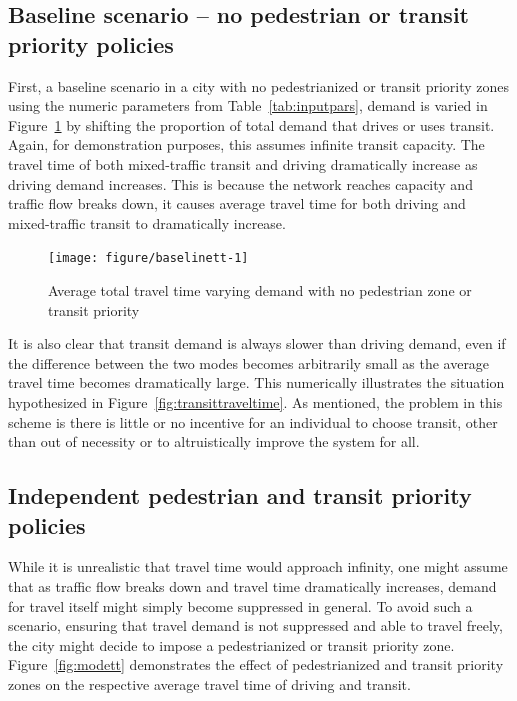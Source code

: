 \documentclass{elsarticle}\usepackage[]{graphicx}\usepackage[]{color}
\newenvironment{knitrout}{}{} %
\begin{document}
\subsection{Baseline scenario -- no pedestrian or transit priority policies}
First, a baseline scenario in a city with no pedestrianized or transit priority zones using the numeric parameters from Table~\ref{tab:inputpars}, demand is varied in Figure~\ref{fig:baselinett} by shifting the proportion of total demand that drives or uses transit. Again, for demonstration purposes, this assumes infinite transit capacity. The travel time of both mixed-traffic transit and driving dramatically increase as driving demand increases. This is because the network reaches capacity and traffic flow breaks down, it causes average travel time for both driving and mixed-traffic transit to dramatically increase.

\begin{figure}[H]
    \centering
\begin{knitrout}
\color{fgcolor}
\texttt{[image: figure/baselinett-1]} 
\end{knitrout}
    \caption{Average total travel time varying demand with no pedestrian zone or transit priority}
    \label{fig:baselinett}
\end{figure}

It is also clear that transit demand is always slower than driving demand, even if the difference between the two modes becomes arbitrarily small as the average travel time becomes dramatically large. This numerically illustrates the situation hypothesized in Figure~\ref{fig:transittraveltime}. As mentioned, the problem in this scheme is there is little or no incentive for an individual to choose transit, other than out of necessity or to altruistically improve the system for all. 


\subsection{Independent pedestrian and transit priority policies}
While it is unrealistic that travel time would approach infinity, one might assume that as traffic flow breaks down and travel time dramatically increases, demand for travel itself might simply become suppressed in general. To avoid such a scenario, ensuring that travel demand is not suppressed and able to travel freely, the city might decide to impose a pedestrianized or transit priority zone. Figure~\ref{fig:modett} demonstrates the effect of pedestrianized and transit priority zones on the respective average travel time of driving and transit.
\end{document}
